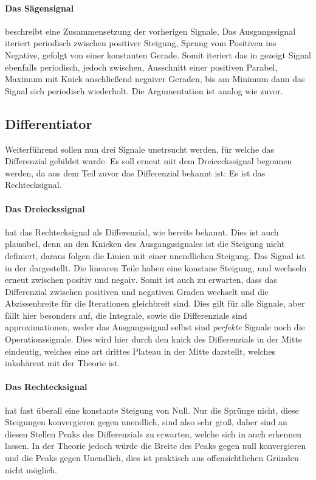 \paragraph{Das Sägensignal} beschreibt eine Zusammensetzung der vorherigen Signale, Das Ausgangssignal iteriert periodisch zwischen positiver Steigung, Sprung vom Positiven ins Negative, gefolgt von einer konstanten Gerade. 
Somit iteriert das in  gezeigt Signal ebenfalls periodisch, jedoch zwischen, Ausschnitt einer positiven Parabel, Maximum mit Knick anschließend negaiver Geraden, bis am Minimum dann das Signal sich periodisch wiederholt. Die Argumentation ist analog wie zuvor.

\subsection{Differentiator}
Weiterführend sollen nun drei Signale unetrsucht werden, für welche das Differenzial gebildet wurde. Es soll erneut mit dem Dreiceckssignal begonnen werden, da aus dem Teil zuvor das Differenzial bekannt ist: Es ist das Rechtecksignal.
\paragraph{Das Dreieckssignal} hat das Rechtecksignal als Differenzial, wie bereits bekannt. Dies ist auch plausibel, denn an den Knicken des Ausgangssignales ist die Steigung nicht definiert, daraus folgen die Linien mit einer unendlichen Steigung. Das Signal ist in der  dargestellt. Die linearen Teile haben eine konstane Steigung, und wechseln erneut zwischen positiv und negaiv. Somit ist auch zu erwarten, dass das Differenzial zwischen positiven und negativen Graden wechselt und die Abzissenbreite für die Iterationen gleichbreit sind. 
Dies gilt für alle Signale, aber fällt hier besonders auf, die Integrale, sowie die Differenziale sind approximationen, weder das Ausgangssignal selbst sind \emph{perfekte} Signale noch die Operationssignale. Dies wird hier durch den knick des Differenzials in der Mitte eindeutig, welches eine art drittes Plateau in der Mitte darstellt, welches inkohärent mit der Theorie ist.

\paragraph{Das Rechtecksignal} hat fast überall eine konstante Steigung von Null. Nur die Sprünge nicht, diese Steigungen konvergieren gegen unendlich, sind also sehr groß, daher sind an diesen Stellen Peaks des Differenzials zu erwarten, welche sich in  auch erkennen lassen. In der Theorie jedoch würde die Breite des Peaks gegen null konvergieren und die Peaks gegen Unendlich, dies ist praktisch aus offensichtlichen Gründen nicht möglich.
\\
\\
\\
\\


